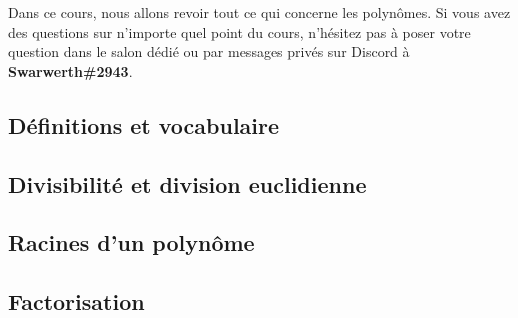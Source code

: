 \noindent Dans ce cours, nous allons revoir tout ce qui concerne les polynômes. Si vous avez des questions sur n'importe quel point du cours, n'hésitez pas à poser votre question dans le salon dédié ou par messages privés sur Discord à \textbf{Swarwerth\#2943}.

\subsection{Définitions et vocabulaire}

\clearpage

\subsection{Divisibilité et division euclidienne}

\clearpage

\subsection{Racines d'un polynôme}

\clearpage

\subsection{Factorisation}

\clearpage